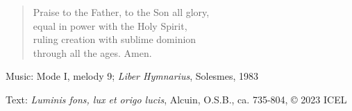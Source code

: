 \hymn



\setlength{\leftmargini}{2em}
\begin{verse}
Praise to the Father, to the Son all glory,\\
equal in power with the Holy Spirit,\\
ruling creation with sublime dominion\\
through all the ages. Amen.
\end{verse}
\setlength{\leftmargini}{\defleftmargini}

\begin{hymnsource}
Music: Mode I, melody 9; \emph{Liber Hymnarius}, Solesmes, 1983

Text: \emph{Luminis fons, lux et origo lucis}, Alcuin, O.S.B., ca. 735-804, © 2023 ICEL
\end{hymnsource}
